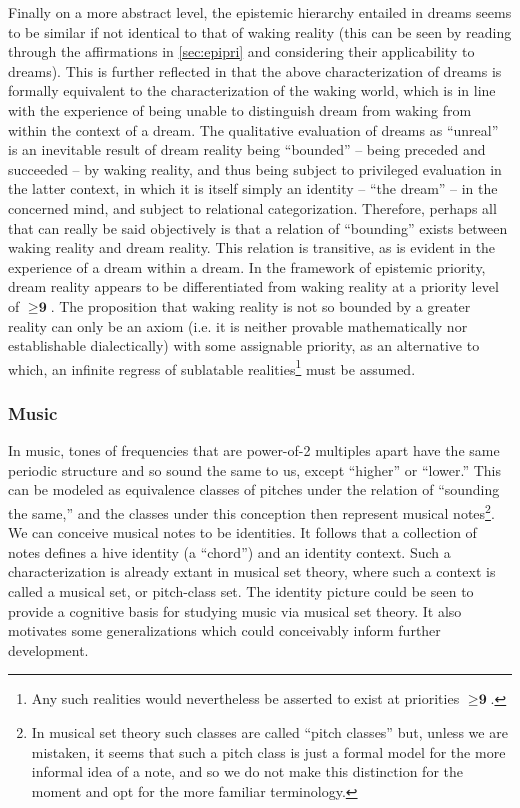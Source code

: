 \documentclass[pra,twocolumn,groupedaddress,10pt]{revtex4}
\theoremstyle{definition}
\begin{document}
Finally on a more abstract level, the epistemic hierarchy entailed in dreams seems to be similar if not identical to that of waking reality (this can be seen by reading through the affirmations in \autoref{sec:epipri} and considering their applicability to dreams). This is further reflected in that the above characterization of dreams is formally equivalent to the characterization of the waking world, which is in line with the experience of being unable to distinguish dream from waking from within the context of a dream. The qualitative evaluation of dreams as ``unreal'' is an inevitable result of dream reality being ``bounded'' -- being preceded and succeeded -- by waking reality, and thus being subject to privileged evaluation in the latter context, in which it is itself simply an identity -- ``the dream'' -- in the concerned mind, and subject to relational categorization. Therefore, perhaps all that can really be said objectively is that a relation of ``bounding'' exists between waking reality and dream reality. This relation is transitive, as is evident in the experience of a dream within a dream. In the framework of epistemic priority, dream reality appears to be differentiated from waking reality at a priority level of $\ge \textbf{9}$. The proposition that waking reality is not so bounded by a greater reality can only be an axiom (i.e. it is neither provable mathematically nor establishable dialectically) with some assignable priority, as an alternative to which, an infinite regress of sublatable realities\footnote{Any such realities would nevertheless be asserted to exist at priorities $\ge \textbf{9}$.} must be assumed.

\subsubsection{Music} \label{sec:music}

In music, tones of frequencies that are power-of-2 multiples apart have the same periodic structure and so sound the same to us, except ``higher'' or ``lower.'' This can be modeled as equivalence classes of pitches under the relation of ``sounding the same,'' and the classes under this conception then represent musical notes\footnote{In musical set theory such classes are called ``pitch classes'' but, unless we are mistaken, it seems that such a pitch class is just a formal model for the more informal idea of a note, and so we do not make this distinction for the moment and opt for the more familiar terminology.}. We can conceive musical notes to be identities. It follows that a collection of notes defines a hive identity (a ``chord'') and an identity context. Such a characterization is already extant in musical set theory\cite{musicalsettheory}, where such a context is called a musical set, or pitch-class set. The identity picture could be seen to provide a cognitive basis for studying music via musical set theory. It also motivates some generalizations which could conceivably inform further development.
\end{document}
